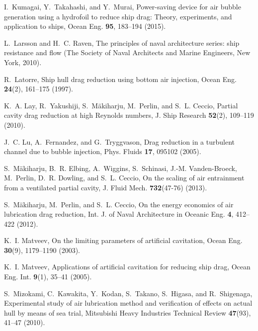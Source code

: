 \documentclass[aps,onecolumn,10pt, floatfix, superscriptaddress,longbibliography, pra]{revtex4-1}
\begin{document}
\begin{thebibliography}{44}
I.~Kumagai, Y.~Takahashi, and Y.~Murai, {Power-saving device for air bubble
  generation using a hydrofoil to reduce ship drag: Theory, experiments, and
  application to ships}, Ocean Eng. \textbf{95}, 183--194 (2015).

L.~Larsson and H.~C. Raven, The principles of naval architecture series: ship
  resistance and flow (The Society of Naval Architects and Marine Engineers,
  New York, 2010).

R.~Latorre, Ship hull drag reduction using bottom air injection, Ocean Eng.
  \textbf{24}(2), 161--175 (1997).

K.~A. Lay, R.~Yakushiji, S.~M{\"a}kiharju, M.~Perlin, and S.~L. Ceccio, Partial
  cavity drag reduction at high {Reynolds} numbers, {J. Ship Research}
  \textbf{52}(2), 109--119 (2010).

J.~C. Lu, A.~Fernandez, and G.~Tryggvason, Drag reduction in a turbulent
  channel due to bubble injection, Phys. Fluids \textbf{17}, 095102 (2005).

S.~M{\"a}kiharju, B.~R. Elbing, A.~Wiggins, S.~Schinasi, J.-M. Vanden-Broeck,
  M.~Perlin, D.~R. Dowling, and S.~L. Ceccio, On the scaling of air entrainment
  from a ventilated partial cavity, {J. Fluid Mech.} \textbf{732}(47-76)
  (2013).

S.~M{\"a}kiharju, M.~Perlin, and S.~L. Ceccio, On the energy economics of air
  lubrication drag reduction, {Int. J. of Naval Architecture in Oceanic Eng.}
  \textbf{4}, 412--422 (2012).

K.~I. Matveev, On the limiting parameters of artificial cavitation, Ocean Eng.
  \textbf{30}(9), 1179--1190 (2003).

K.~I. Matveev, Applications of artificial cavitation for reducing ship drag,
  Ocean Eng. Int. \textbf{9}(1), 35--41 (2005).

S.~Mizokami, C.~Kawakita, Y.~Kodan, S.~Takano, S.~Higasa, and R.~Shigenaga,
  Experimental study of air lubrication method and verification of effects on
  actual hull by means of sea trial, Mitsubishi Heavy Industries Technical
  Review \textbf{47}(93), 41--47 (2010).


\end{thebibliography}
\end{document}
